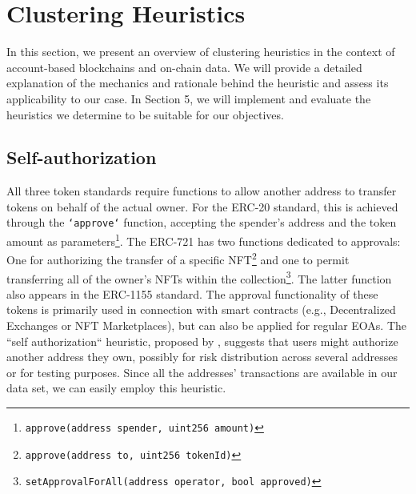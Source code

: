 \documentclass[12pt,a4paper,titlepage,oneside,english]{article}
\begin{document}

\section{Clustering Heuristics}
In this section, we present an overview of clustering heuristics in the context of account-based blockchains and on-chain data. We will provide a detailed explanation of the mechanics and rationale behind the heuristic and assess its applicability to our case. 
In Section 5, we will implement and evaluate the heuristics we determine to be suitable for our objectives.

\subsection{Self-authorization} 
	All three token standards require functions to allow another address to transfer tokens on behalf of the actual owner. For the ERC-20 standard, this is achieved through the \texttt{`approve`} function, accepting the spender's address and the token amount as parameters\footnote{\texttt{approve(address spender, uint256 amount)}}. The ERC-721 has two functions dedicated to approvals: One for authorizing the transfer of a specific NFT\footnote{\texttt{approve(address to, uint256 tokenId)}} and one to permit transferring all of the owner's NFTs within the collection\footnote{\texttt{setApprovalForAll(address operator, bool approved)}}. The latter function also appears in the ERC-1155 standard. The approval functionality of these tokens is primarily used in connection with smart contracts (e.g., Decentralized Exchanges or NFT Marketplaces), but can also be applied for regular EOAs. \newline
The ``self authorization`` heuristic, proposed by \cite{FV:17}, suggests that users might authorize another address they own, possibly for risk distribution across several addresses or for testing purposes. \newline
Since all the addresses' transactions are available in our data set, we can easily employ this heuristic.

\iffalse
For the ERC-20 standard: \texttt{approve(address spender, uint256 amount)}
For the ERC-721 standard: \texttt{approve(address to, uint256 tokenId)} and \texttt{setApprovalForAll(address operator, bool approved)}\\
For the ERC-1155 standard: \texttt{setApprovalForAll(address operator, bool approved)}
\fi
\end{document}
